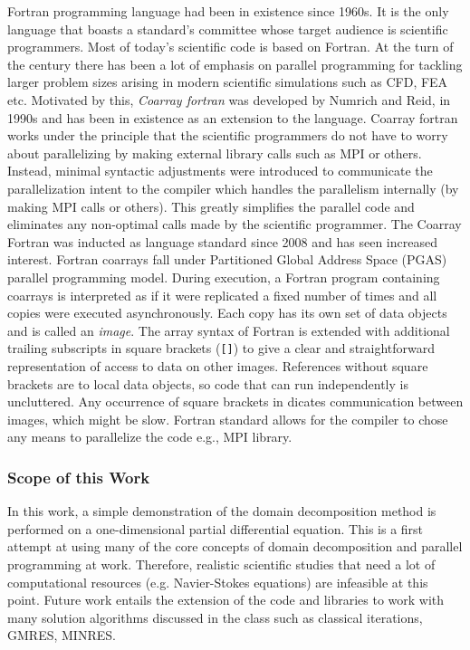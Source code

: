 \documentclass[12pt]{report}
\begin{document}
Fortran programming language had been in existence since 1960s. It is
the only language that boasts a standard's committee whose target
audience is scientific programmers. Most of today's scientific code is
based on Fortran. At the turn of the century there has been a lot of
emphasis on parallel programming for tackling larger problem sizes
arising in modern scientific simulations such as CFD, FEA
etc. Motivated by this, \emph{Coarray fortran} was developed by Numrich
and Reid, in 1990s and has been in existence as an extension to the
language. Coarray fortran works under the principle that the
scientific programmers do not have to worry about parallelizing by
making external library calls such as MPI or others. Instead, minimal
syntactic adjustments were introduced to communicate the
parallelization intent to the compiler which handles the parallelism
internally (by making MPI calls or others). This greatly simplifies
the parallel code and eliminates any non-optimal calls made by the
scientific programmer. The Coarray Fortran was inducted as language
standard since 2008 and has seen increased interest.  Fortran coarrays
fall under Partitioned Global Address Space (PGAS) parallel
programming model. During execution, a Fortran program containing
coarrays is interpreted as if it were replicated a fixed number of
times and all copies were executed asynchronously. Each copy has its
own set of data objects and is called an \emph{image}. The array
syntax of Fortran is extended with additional trailing subscripts in
square brackets (\texttt{[]}) to give a clear and straightforward
representation of access to data on other images.  References without
square brackets are to local data objects, so code that can run
independently is uncluttered. Any occurrence of square brackets in
dicates communication between images, which might be slow.  Fortran
standard allows for the compiler to chose any means to parallelize the
code e.g., MPI library.

\subsubsection{Scope of this Work}

In this work, a simple demonstration of the domain decomposition method
is performed on a one-dimensional partial differential equation. This
is a first attempt at using many of the core concepts of domain
decomposition and parallel programming at work. Therefore, realistic
scientific studies that need a lot of computational resources
(e.g. Navier-Stokes equations) are infeasible at this point. Future
work entails the extension of the code and libraries to work with many
solution algorithms discussed in the class such as classical
iterations, GMRES, MINRES.
\end{document}
